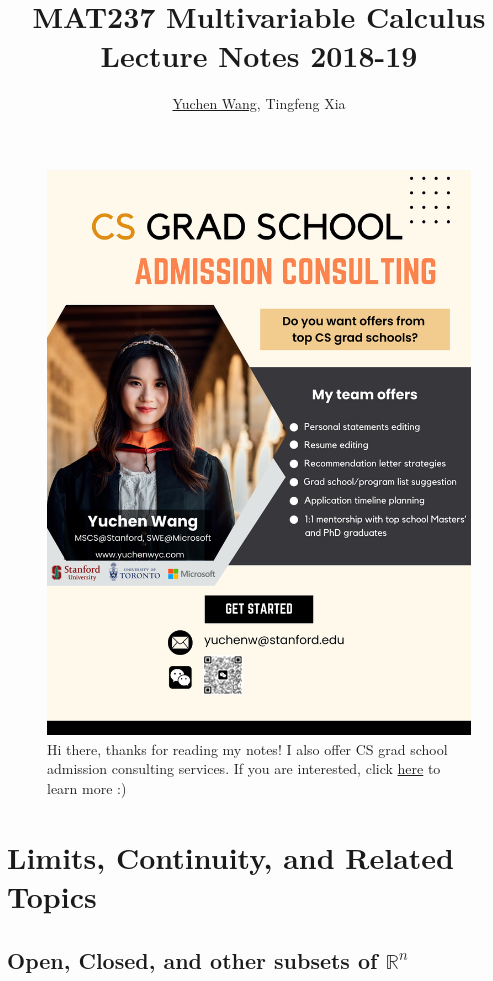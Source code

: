 \documentclass[11pt]{article}
\title{MAT237 Multivariable Calculus \\ Lecture Notes 2018-19}
\author{\textcolor{blue}{\href{https://www.yuchenwyc.com}{Yuchen Wang}}, Tingfeng Xia}
\newcommand{\real}[0]{\mathbb{R}}
\begin{document}
    \maketitle
    \tableofcontents
    \newpage
    
\begin{figure}[h]
	\centering
	\includegraphics[scale=0.21]{../ad.png}
	\caption{Hi there, thanks for reading my notes! I also offer CS grad school admission consulting services. If you are interested, click \textcolor{blue}{\href{https://www.yuchenwyc.com/files/admission_consulting.pdf}{here}} to learn more :)}
\end{figure}

\section{Limits, Continuity, and Related Topics}
\subsection{Open, Closed, and other subsets of $\real^n$}
\end{document}
